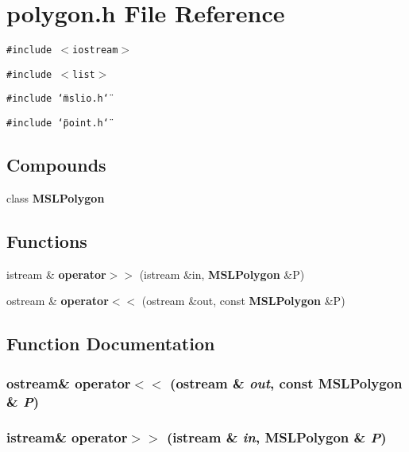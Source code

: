 \section{polygon.h File Reference}
\label{polygon_8h}
{\tt \#include $<$iostream$>$}\par
{\tt \#include $<$list$>$}\par
{\tt \#include \char`\"{}mslio.h\char`\"{}}\par
{\tt \#include \char`\"{}point.h\char`\"{}}\par
\subsection*{Compounds}
\begin{CompactItemize}
\item 
class {\bf MSLPolygon}
\end{CompactItemize}
\subsection*{Functions}
\begin{CompactItemize}
\item 
istream \& {\bf operator$>$$>$} (istream \&in, {\bf MSLPolygon} \&P)
\item 
ostream \& {\bf operator$<$$<$} (ostream \&out, const {\bf MSLPolygon} \&P)
\end{CompactItemize}


\subsection{Function Documentation}
\subsubsection{\setlength{\rightskip}{0pt plus 5cm}ostream\& operator$<$$<$ (ostream \& {\em out}, const {\bf MSLPolygon} \& {\em P})}\label{polygon_8h_a1}


\subsubsection{\setlength{\rightskip}{0pt plus 5cm}istream\& operator$>$$>$ (istream \& {\em in}, {\bf MSLPolygon} \& {\em P})}\label{polygon_8h_a0}



